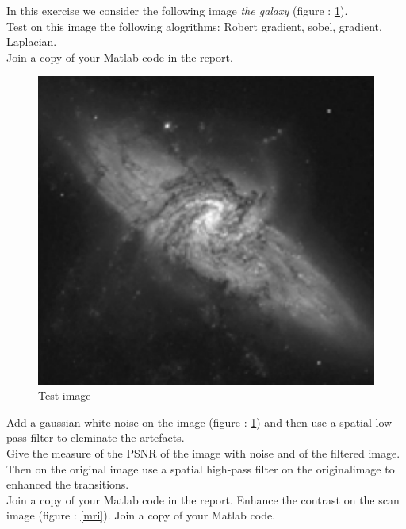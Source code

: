 \documentclass[12pt]{tdtp}
\begin{document}
\titre

\Exo

In this exercise we consider the following image \textit{the galaxy} (figure : \ref{Galaxy}).\\
Test on this image the following alogrithms: Robert gradient, sobel, gradient, Laplacian.\\
Join a copy of your Matlab code in the report.


\begin{figure}[h!]
	\begin{center}
		\includegraphics[scale=0.5]{images/galaxy.png}
		\caption{Test image}
		\label{Galaxy}
	\end{center}
\end{figure}

\newpage 
\Exo


Add a gaussian white noise on the image (figure : \ref{Galaxy}) and then use a spatial low-pass filter to eleminate the artefacts.\\
Give the measure of the PSNR of the image with noise and of the filtered image.\\
Then on the original image use a spatial high-pass filter on the originalimage to enhanced the transitions.\\
Join a copy of your Matlab code in the report.
\newpage 
\Exo
Enhance the contrast on the scan image (figure : \ref{mri}).
Join a copy of your Matlab code.
\end{document}
